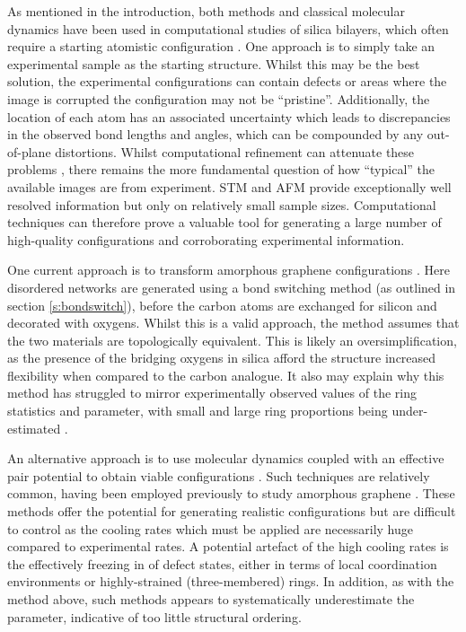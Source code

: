 As mentioned in the  introduction, both \abinitio{} methods and classical molecular dynamics have been used in computational studies of silica bilayers, which often require a starting atomistic configuration  \cite{Bjorkman2013,Malashevich2016,Wilson2013,Roy2018}.  
One approach is to simply take an experimental sample as the starting structure. 
Whilst this may be the best solution, the experimental configurations can contain defects or areas where the image is corrupted \ie{} the configuration may not be ``pristine''.
Additionally, the location of each atom has an associated uncertainty which leads to discrepancies in the observed bond lengths and angles, which can be compounded by any out\--of\--plane distortions.
Whilst computational refinement can attenuate these problems \cite{Sadjadi2017,Wilson2018}, there remains the more fundamental question of how ``typical'' the available images are from experiment.
STM and AFM provide exceptionally well resolved information but only on relatively small sample sizes.
Computational techniques can therefore prove a valuable tool for generating a large number of high\--quality configurations and corroborating experimental information.  

One current approach is to transform amorphous graphene configurations \cite{Wilson2013}.
Here disordered networks are generated using a bond switching method (as outlined in section \ref{s:bondswitch}), before the carbon atoms are exchanged for silicon and decorated with oxygens.
Whilst this is a valid approach, the method assumes that the two materials are topologically equivalent.
This is likely an oversimplification, as the presence of the bridging oxygens in silica afford the structure increased flexibility when compared to the carbon analogue.
It also may explain why this method has struggled to mirror experimentally observed values of the ring statistics and \aw{} parameter, with small and large ring proportions being under\--estimated \cite{Kumar2014}.

An alternative approach is to use molecular dynamics coupled with an effective pair potential to obtain viable configurations \cite{Roy2018}.
Such techniques are relatively common, having been employed previously to study amorphous graphene \cite{Kumar2012}. 
These methods offer the potential for generating realistic configurations but are difficult to control as the cooling rates which must be applied are necessarily huge compared to experimental rates. 
A potential artefact of the high cooling rates is the effectively freezing in of defect states, either in terms of local coordination environments or highly\--strained (three-membered) rings.
In addition, as with the method above, such methods appears to systematically underestimate the \aw{} parameter, indicative of too little structural ordering.

